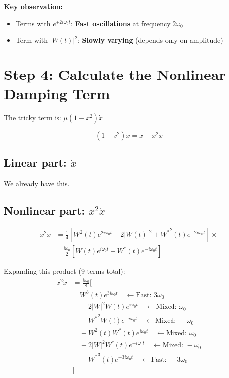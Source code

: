 \documentclass{article}
\begin{document}
\textbf{Key observation:}
\begin{itemize}
    \item Terms with $e^{\pm 2i\omega_0 t}$: \textbf{Fast oscillations} at frequency $2\omega_0$
    \item Term with $|W(t)|^2$: \textbf{Slowly varying} (depends only on amplitude)
\end{itemize}

\section{Step 4: Calculate the Nonlinear Damping Term}

The tricky term is: $\mu(1 - x^2)\dot{x}$

\begin{equation}
(1 - x^2)\dot{x} = \dot{x} - x^2\dot{x}
\end{equation}

\subsection{Linear part: $\dot{x}$}
We already have this.

\subsection{Nonlinear part: $x^2\dot{x}$}
\begin{align}
x^2\dot{x} &= \frac{1}{4}[W^2(t)e^{2i\omega_0 t} + 2|W(t)|^2 + {W^*}^2(t)e^{-2i\omega_0 t}] \times \nonumber \\
&\quad \frac{i\omega_0}{2}[W(t)e^{i\omega_0 t} - W^*(t)e^{-i\omega_0 t}]
\end{align}

Expanding this product (9 terms total):
\begin{align}
x^2\dot{x} &= \frac{i\omega_0}{8}[ \nonumber \\
&\quad W^3(t)e^{3i\omega_0 t} \quad \leftarrow \text{Fast: } 3\omega_0 \nonumber \\
&\quad + 2|W|^2 W(t)e^{i\omega_0 t} \quad \leftarrow \text{Mixed: } \omega_0 \nonumber \\
&\quad + {W^*}^2 W(t)e^{-i\omega_0 t} \quad \leftarrow \text{Mixed: } -\omega_0 \nonumber \\
&\quad - W^2(t)W^*(t)e^{i\omega_0 t} \quad \leftarrow \text{Mixed: } \omega_0 \nonumber \\
&\quad - 2|W|^2 W^*(t)e^{-i\omega_0 t} \quad \leftarrow \text{Mixed: } -\omega_0 \nonumber \\
&\quad - {W^*}^3(t)e^{-3i\omega_0 t} \quad \leftarrow \text{Fast: } -3\omega_0 \nonumber \\
&]
\end{align}
\end{document}

